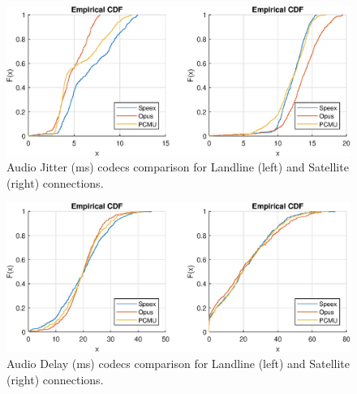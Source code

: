 \documentclass[parskip=full]{scrartcl}
\begin{document}
\begin{figure}
    \centering
    \includegraphics[width=1\textwidth]{results/Audio_Codecs_Satellite_Jitter.eps} 
    \caption{Audio Jitter (ms) codecs comparison for Landline (left) and Satellite (right) connections. }
    \label{fig:audio_jitter}
\end{figure}

\begin{figure}
    \centering
    \includegraphics[width=1\textwidth]{results/Audio_Codecs_Satellite_Delay.eps} 
    \caption{Audio Delay (ms) codecs comparison for Landline (left) and Satellite (right) connections. }
    \label{fig:audio_delay}
\end{figure}




\end{document}
